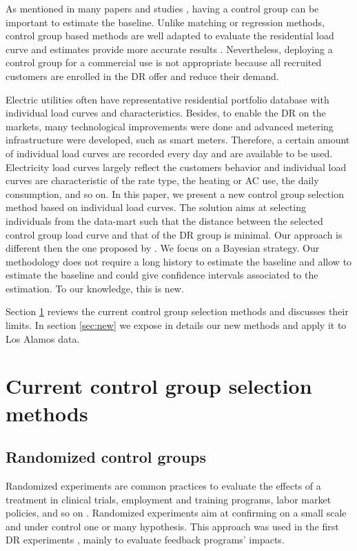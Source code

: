 \documentclass[journal]{IEEEtran}
\begin{document}
As mentioned in many papers \cite{behavorial_energy_policy,social_norms} and studies
\cite{Rex_baseline,experimental_evidence}, 
having a control group can be important to estimate the baseline. Unlike matching 
or regression methods, control group based methods are well adapted to evaluate the residential load
curve and estimates provide more accurate results \cite{Rex_baseline}. Nevertheless, deploying 
a control group for a commercial use is not appropriate because all recruited customers 
are enrolled in the DR offer and reduce their demand.  


Electric utilities often have representative residential portfolio
database with individual load curves and characteristics. Besides, to
enable the DR on the markets, many technological improvements were
done and advanced metering infrastructure were developed, such as
smart meters. Therefore, a certain amount of individual load curves
are recorded every day and are available to be used. Electricity load
curves largely reflect the customers behavior and individual load
curves are characteristic of the rate type, the heating or AC use, the
daily consumption, and so on. In this paper, we present a new control
group selection method based on individual load curves. The solution
aims at selecting individuals from the data-mart such that the
distance between the selected control group load curve and that of the
DR group is minimal. Our approach is different then the one proposed
by \cite{directestimation}. We focus on a Bayesian strategy. Our methodology does not require
a long history to estimate the baseline and allow to estimate the baseline and could give
confidence intervals associated to the estimation. To our knowledge, this is new.

Section \ref{sec:current} reviews the current control group selection
methods and discusses their limits. In section \ref{sec:new} we expose
in details our new methods and apply it to Los Alamos data.


\section{Current control group selection methods}\label{sec:current}
\subsection{Randomized control groups}
Randomized experiments are common practices to evaluate the effects of a 
treatment in clinical trials, employment and training programs, 
labor market policies, and so on \cite{behavorial_energy_policy}. Randomized  
experiments aim at confirming on a small scale and 
under control one or many hypothesis. This approach was used in the first 
DR experiments \cite{Rex_expe_mondiales}, mainly to
evaluate feedback programs' impacts.
\end{document}

